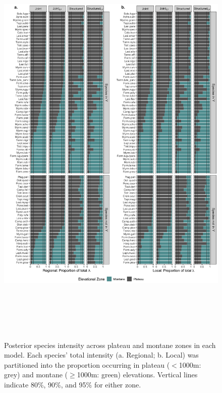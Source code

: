 \documentclass[preprint,review,times,12pt]{elsarticle}
\begin{document}
\begin{figure}
	\centering\includegraphics[height=8in]{ms/1_Ecography/1/figs/lambda_zones.png}
	\caption{\label{fig:lam_zones} Posterior species intensity across plateau and montane zones in each model. Each species' total intensity (a. Regional; b. Local) was partitioned into the proportion occurring in plateau ($<$1000m: grey) and montane ($\geq$1000m: green) elevations. Vertical lines indicate 80\%, 90\%, and 95\% for either zone. }
\end{figure}
\end{document}
